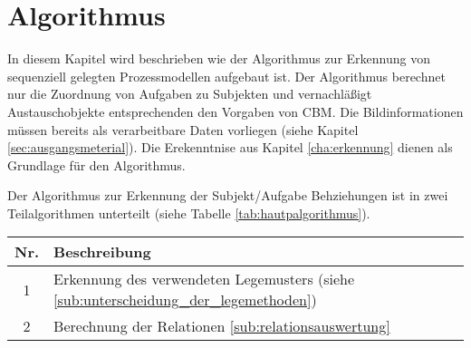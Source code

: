 %
%
% 
% 
% 


\chapter{Algorithmus} 
\label{cap:algorithmus}
In diesem Kapitel wird beschrieben wie der Algorithmus zur Erkennung von sequenziell gelegten Prozessmodellen aufgebaut ist. Der Algorithmus berechnet nur die Zuordnung von Aufgaben zu Subjekten und vernachläßigt Austauschobjekte entsprechenden den Vorgaben von CBM. Die Bildinformationen müssen bereits als verarbeitbare Daten vorliegen (siehe Kapitel \ref{sec:ausgangsmeterial}). Die Erekenntnise aus Kapitel \ref{cha:erkennung} dienen als Grundlage für den Algorithmus.



Der Algorithmus zur Erkennung der Subjekt/Aufgabe Behziehungen ist in zwei Teilalgorithmen unterteilt (siehe Tabelle \ref{tab:hautpalgorithmus}). 

\begin{center}
	\label{tab:hautpalgorithmus}
	\begin{tabularx}
		{1.0\linewidth}{ c X } \textbf{Nr.} & \textbf{Beschreibung} \\
		\hline 1 & Erkennung des verwendeten Legemusters (siehe \ref{sub:unterscheidung_der_legemethoden})\\
		\hline 2 & Berechnung der Relationen \ref{sub:relationsauswertung}
	\end{tabularx}
\end{center}

